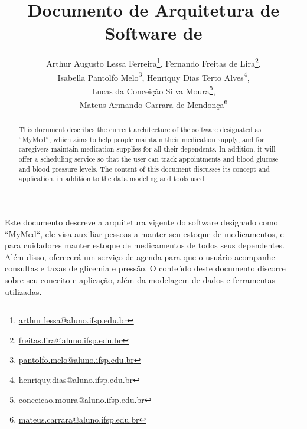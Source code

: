 \documentclass[
	article,			%
	12pt,				%
	oneside,			%
	a4paper,			%
    BIBLATEX,           %
	english,			%
	brazil,				%
	sumario=tradicional
	]{abntex2}
\title{Documento de Arquitetura de Software de \nomeprojeto}
\author{
Arthur Augusto Lessa Ferreira\inst{1}\thanks{\url{arthur.lessa@aluno.ifsp.edu.br}}, 
Fernando Freitas de Lira\inst{1}\thanks{\url{freitas.lira@aluno.ifsp.edu.br}},
\\ Isabella Pantolfo Melo\inst{1}\thanks{\url{pantolfo.melo@aluno.ifsp.edu.br}}, 
Henriquy Dias Terto Alves\inst{1}\thanks{\url{henriquy.dias@aluno.ifsp.edu.br}},
\\ Lucas da Conceição Silva Moura\inst{1}\thanks{\url{conceicao.moura@aluno.ifsp.edu.br}},
\\ Mateus Armando Carrara de Mendonça\inst{1}\thanks{\url{mateus.carrara@aluno.ifsp.edu.br} }}
\newcommand\nomeprojeto{MyMed}
\begin{document}


\frenchspacing 


%
%

\maketitle


\begin{abstract}
    This document describes the current architecture of the software designated as ``\nomeprojeto``, which aims to help people maintain their medication supply; and for caregivers maintain medication supplies for all their dependents. In addition, it will offer a scheduling service so that the user can track appointments and blood glucose and blood pressure levels. The content of this document discusses its concept and application, in addition to the data modeling and tools used.
\end{abstract}
     
\begin{resumo1} 
  Este documento descreve a arquitetura vigente do software designado como ``\nomeprojeto``, ele visa auxiliar pessoas a manter seu estoque de medicamentos, e para cuidadores manter estoque de medicamentos de todos seus dependentes. Além disso, oferecerá um serviço de agenda para que o usuário acompanhe consultas e taxas de glicemia e pressão. O conteúdo deste documento discorre sobre seu conceito e aplicação, além da modelagem de dados e ferramentas utilizadas.
\end{resumo1}




\end{document}
